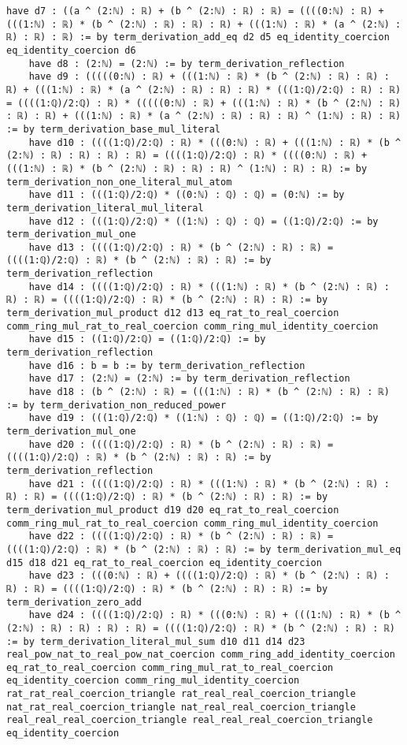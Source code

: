 \documentclass{article}
\begin{document}
\begin{tcolorbox}[colback=white!10, width=\linewidth]
\begin{lstlisting}[language=Lean4]
    have d7 : ((a ^ (2:ℕ) : ℝ) + (b ^ (2:ℕ) : ℝ) : ℝ) = ((((0:ℕ) : ℝ) + (((1:ℕ) : ℝ) * (b ^ (2:ℕ) : ℝ) : ℝ) : ℝ) + (((1:ℕ) : ℝ) * (a ^ (2:ℕ) : ℝ) : ℝ) : ℝ) := by term_derivation_add_eq d2 d5 eq_identity_coercion eq_identity_coercion d6
    have d8 : (2:ℕ) = (2:ℕ) := by term_derivation_reflection
    have d9 : (((((0:ℕ) : ℝ) + (((1:ℕ) : ℝ) * (b ^ (2:ℕ) : ℝ) : ℝ) : ℝ) + (((1:ℕ) : ℝ) * (a ^ (2:ℕ) : ℝ) : ℝ) : ℝ) * (((1:ℚ)/2:ℚ) : ℝ) : ℝ) = ((((1:ℚ)/2:ℚ) : ℝ) * (((((0:ℕ) : ℝ) + (((1:ℕ) : ℝ) * (b ^ (2:ℕ) : ℝ) : ℝ) : ℝ) + (((1:ℕ) : ℝ) * (a ^ (2:ℕ) : ℝ) : ℝ) : ℝ) ^ (1:ℕ) : ℝ) : ℝ) := by term_derivation_base_mul_literal
    have d10 : ((((1:ℚ)/2:ℚ) : ℝ) * (((0:ℕ) : ℝ) + (((1:ℕ) : ℝ) * (b ^ (2:ℕ) : ℝ) : ℝ) : ℝ) : ℝ) = ((((1:ℚ)/2:ℚ) : ℝ) * ((((0:ℕ) : ℝ) + (((1:ℕ) : ℝ) * (b ^ (2:ℕ) : ℝ) : ℝ) : ℝ) ^ (1:ℕ) : ℝ) : ℝ) := by term_derivation_non_one_literal_mul_atom
    have d11 : (((1:ℚ)/2:ℚ) * ((0:ℕ) : ℚ) : ℚ) = (0:ℕ) := by term_derivation_literal_mul_literal
    have d12 : (((1:ℚ)/2:ℚ) * ((1:ℕ) : ℚ) : ℚ) = ((1:ℚ)/2:ℚ) := by term_derivation_mul_one
    have d13 : ((((1:ℚ)/2:ℚ) : ℝ) * (b ^ (2:ℕ) : ℝ) : ℝ) = ((((1:ℚ)/2:ℚ) : ℝ) * (b ^ (2:ℕ) : ℝ) : ℝ) := by term_derivation_reflection
    have d14 : ((((1:ℚ)/2:ℚ) : ℝ) * (((1:ℕ) : ℝ) * (b ^ (2:ℕ) : ℝ) : ℝ) : ℝ) = ((((1:ℚ)/2:ℚ) : ℝ) * (b ^ (2:ℕ) : ℝ) : ℝ) := by term_derivation_mul_product d12 d13 eq_rat_to_real_coercion comm_ring_mul_rat_to_real_coercion comm_ring_mul_identity_coercion
    have d15 : ((1:ℚ)/2:ℚ) = ((1:ℚ)/2:ℚ) := by term_derivation_reflection
    have d16 : b = b := by term_derivation_reflection
    have d17 : (2:ℕ) = (2:ℕ) := by term_derivation_reflection
    have d18 : (b ^ (2:ℕ) : ℝ) = (((1:ℕ) : ℝ) * (b ^ (2:ℕ) : ℝ) : ℝ) := by term_derivation_non_reduced_power
    have d19 : (((1:ℚ)/2:ℚ) * ((1:ℕ) : ℚ) : ℚ) = ((1:ℚ)/2:ℚ) := by term_derivation_mul_one
    have d20 : ((((1:ℚ)/2:ℚ) : ℝ) * (b ^ (2:ℕ) : ℝ) : ℝ) = ((((1:ℚ)/2:ℚ) : ℝ) * (b ^ (2:ℕ) : ℝ) : ℝ) := by term_derivation_reflection
    have d21 : ((((1:ℚ)/2:ℚ) : ℝ) * (((1:ℕ) : ℝ) * (b ^ (2:ℕ) : ℝ) : ℝ) : ℝ) = ((((1:ℚ)/2:ℚ) : ℝ) * (b ^ (2:ℕ) : ℝ) : ℝ) := by term_derivation_mul_product d19 d20 eq_rat_to_real_coercion comm_ring_mul_rat_to_real_coercion comm_ring_mul_identity_coercion
    have d22 : ((((1:ℚ)/2:ℚ) : ℝ) * (b ^ (2:ℕ) : ℝ) : ℝ) = ((((1:ℚ)/2:ℚ) : ℝ) * (b ^ (2:ℕ) : ℝ) : ℝ) := by term_derivation_mul_eq d15 d18 d21 eq_rat_to_real_coercion eq_identity_coercion
    have d23 : (((0:ℕ) : ℝ) + ((((1:ℚ)/2:ℚ) : ℝ) * (b ^ (2:ℕ) : ℝ) : ℝ) : ℝ) = ((((1:ℚ)/2:ℚ) : ℝ) * (b ^ (2:ℕ) : ℝ) : ℝ) := by term_derivation_zero_add
    have d24 : ((((1:ℚ)/2:ℚ) : ℝ) * (((0:ℕ) : ℝ) + (((1:ℕ) : ℝ) * (b ^ (2:ℕ) : ℝ) : ℝ) : ℝ) : ℝ) = ((((1:ℚ)/2:ℚ) : ℝ) * (b ^ (2:ℕ) : ℝ) : ℝ) := by term_derivation_literal_mul_sum d10 d11 d14 d23 real_pow_nat_to_real_pow_nat_coercion comm_ring_add_identity_coercion eq_rat_to_real_coercion comm_ring_mul_rat_to_real_coercion eq_identity_coercion comm_ring_mul_identity_coercion rat_rat_real_coercion_triangle rat_real_real_coercion_triangle nat_rat_real_coercion_triangle nat_real_real_coercion_triangle real_real_real_coercion_triangle real_real_real_coercion_triangle eq_identity_coercion

\end{lstlisting}
\end{tcolorbox}
\end{document}
